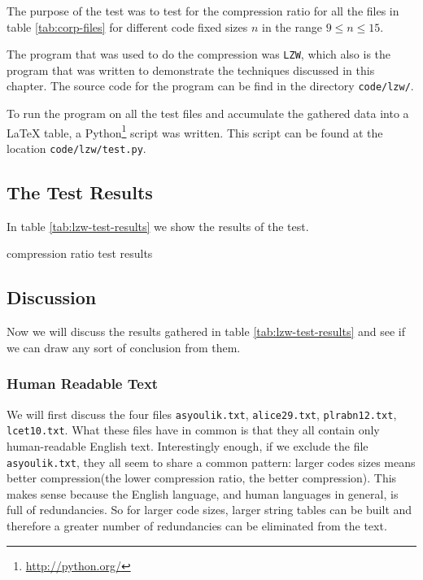 The purpose of the test was to test for the compression ratio for all
the files in table \ref{tab:corp-files} for different code fixed sizes
$n$ in the range $9 \leq n \leq 15$.

The program that was used to do the compression was \verb|LZW|, which
also is the program that was written to demonstrate the techniques
discussed in this chapter. The source code for the program can be find
in the directory \verb|code/lzw/|.

To run the program on all the test files and accumulate the gathered
data into a \LaTeX{} table, a
Python\footnote{\url{http://python.org/}} script was written. This
script can be found at the location \verb|code/lzw/test.py|.

\subsection{The Test Results}

In table \ref{tab:lzw-test-results} we show the results of the test.

\begin{sidewaystable}
    \small
    \centering
    
    \caption{\lzw compression ratio test results}
    \label{tab:lzw-test-results}
\end{sidewaystable}
\subsection{Discussion}

Now we will discuss the results gathered in table
\ref{tab:lzw-test-results} and see if we can draw any sort of
conclusion from them.

\subsubsection{Human Readable Text}

We will first discuss the four files \verb|asyoulik.txt|,
\verb|alice29.txt|, \verb|plrabn12.txt|, \verb|lcet10.txt|. What these
files have in common is that they all contain only human-readable
English text. Interestingly enough, if we exclude the file
\verb|asyoulik.txt|, they all seem to share a common pattern: larger
codes sizes means better compression(the lower compression ratio, the
better compression). This makes sense because the English language,
and human languages in general, is full of redundancies. So for larger
code sizes, larger string tables can be built and therefore a greater
number of redundancies can be eliminated from the text.

